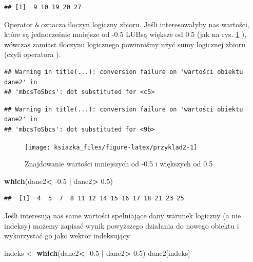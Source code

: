 \documentclass[]{book}
\newenvironment{Shaded}{\begin{snugshade}}{\end{snugshade}}
\newcommand{\KeywordTok}[1]{\textcolor[rgb]{0.13,0.29,0.53}{\textbf{#1}}}
\newcommand{\FloatTok}[1]{\textcolor[rgb]{0.00,0.00,0.81}{#1}}
\newcommand{\StringTok}[1]{\textcolor[rgb]{0.31,0.60,0.02}{#1}}
\newcommand{\OperatorTok}[1]{\textcolor[rgb]{0.81,0.36,0.00}{\textbf{#1}}}
\newcommand{\NormalTok}[1]{#1}
\theoremstyle{definition}
\theoremstyle{definition}
\theoremstyle{definition}
\theoremstyle{remark}
\begin{document}
\begin{verbatim}
## [1]  9 10 19 20 27
\end{verbatim}

Operator \texttt{\&} oznacza iloczyn logiczny zbioru. Jeśli
interesowałyby nas wartości, które są jednocześnie mniejsze od -0.5
LUBsą większe od 0.5 (jak na rys. \ref{fig:przyklad2} ), wówczas zamiast
iloczynu logicznego powinniśmy użyć sumy logicznej zbioru (czyli
operatora \texttt{\textbar{}}).

\begin{verbatim}
## Warning in title(...): conversion failure on 'wartości obiektu dane2' in
## 'mbcsToSbcs': dot substituted for <c5>
\end{verbatim}

\begin{verbatim}
## Warning in title(...): conversion failure on 'wartości obiektu dane2' in
## 'mbcsToSbcs': dot substituted for <9b>
\end{verbatim}

\begin{figure}

{\centering \texttt{[image: ksiazka\_files/figure-latex/przyklad2-1]} 

}

\caption{Znajdowanie wartości mniejszych od -0.5 i większych od 0.5}\label{fig:przyklad2}
\end{figure}

\begin{Shaded}
\begin{Highlighting}[]
\KeywordTok{which}\NormalTok{(dane2}\OperatorTok{<}\StringTok{ }\FloatTok{-0.5} \OperatorTok{|}\StringTok{ }\NormalTok{dane2}\OperatorTok{>}\StringTok{ }\FloatTok{0.5}\NormalTok{)}
\end{Highlighting}
\end{Shaded}

\begin{verbatim}
##  [1]  4  5  7  8 11 12 14 15 16 17 18 21 23 25
\end{verbatim}

Jeśli interesują nas same wartości spełniające dany warunek logiczny (a
nie indeksy) możemy zapisać wynik powyższego działania do nowego obiektu
i wykorzystać go jako wektor indeksujący

\begin{Shaded}
\begin{Highlighting}[]
\NormalTok{indeks <-}\StringTok{ }\KeywordTok{which}\NormalTok{(dane2}\OperatorTok{<}\StringTok{ }\FloatTok{-0.5} \OperatorTok{|}\StringTok{ }\NormalTok{dane2}\OperatorTok{>}\StringTok{ }\FloatTok{0.5}\NormalTok{)}
\NormalTok{dane2[indeks]}
\end{Highlighting}
\end{Shaded}
\end{document}
